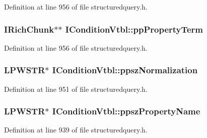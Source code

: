 Definition at line 956 of file structuredquery.\+h.

\subsubsection[{\texorpdfstring{pp\+Property\+Term}{ppPropertyTerm}}]{ {\bf I\+Rich\+Chunk}$\ast$$\ast$ I\+Condition\+Vtbl\+::pp\+Property\+Term}\hypertarget{struct_i_condition_vtbl_a0d7afaf8cfddd2000809db1df71d4578}{}\label{struct_i_condition_vtbl_a0d7afaf8cfddd2000809db1df71d4578}


Definition at line 956 of file structuredquery.\+h.

\subsubsection[{\texorpdfstring{ppsz\+Normalization}{ppszNormalization}}]{ {\bf L\+P\+W\+S\+TR}$\ast$ I\+Condition\+Vtbl\+::ppsz\+Normalization}\hypertarget{struct_i_condition_vtbl_a6b8d36ab4826359e85a3099bd2e24c88}{}\label{struct_i_condition_vtbl_a6b8d36ab4826359e85a3099bd2e24c88}


Definition at line 951 of file structuredquery.\+h.

\subsubsection[{\texorpdfstring{ppsz\+Property\+Name}{ppszPropertyName}}]{ {\bf L\+P\+W\+S\+TR}$\ast$ I\+Condition\+Vtbl\+::ppsz\+Property\+Name}\hypertarget{struct_i_condition_vtbl_af12290460225b60a225ccc6dce149066}{}\label{struct_i_condition_vtbl_af12290460225b60a225ccc6dce149066}


Definition at line 939 of file structuredquery.\+h.

